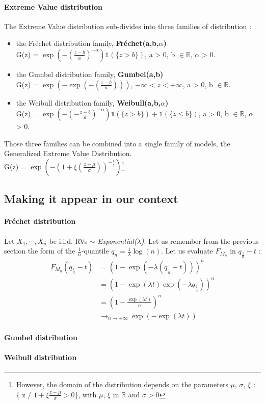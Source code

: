\paragraph{Extreme Value distribution} The Extreme Value distribution sub-divides into three families of distribution :
\begin{itemize}
	\item the Fréchet distribution family, \textbf{Fréchet(a,b,$\alpha$)} \\
	G(z) = $\exp(-(\frac{z-b}{a})^{-\alpha})\mathbb{1}(\{z > b\})$, a > 0, b $\in \mathbb{R}$, $\alpha$ > 0.
	\item the Gumbel distribution family, \textbf{Gumbel(a,b)} \\ 
	G(z) = $\exp(-\exp(-(\frac{z-b}{a})))$, $-\infty < z < +\infty$, a > 0, b $\in \mathbb{R}$.
	\item the Weibull distribution family, \textbf{Weibull(a,b,$\alpha$)} \\
	G(z) = $\exp(-(-\frac{z-b}{a})^{-\alpha})\mathbb{1}(\{z > b\}) + \mathbb{1}(\{z \le b\})$, a > 0, b $\in \mathbb{R}$, $\alpha$ > 0.
\end{itemize}
\newline
Those three families can be combined into a single family of models, the Generalized Extreme Value Distribution. \\
G(z) = $\exp(-(1 + \xi(\frac{z - \mu}{\sigma}))^{-\frac{1}{\xi}})$\footnote{However, the domain of the distribution depends on the parameters $\mu$, $\sigma$, $\xi$ : \{ z / $1 + \xi\frac{z-\mu}{\sigma} > 0$\}, with $\mu$, $\xi$ in $\mathbb{R}$ and $\sigma > 0$}
\subsection{Making it appear in our context}
\paragraph{Fréchet distribution} 
Let $X_1, \cdots, X_n $ be i.i.d. RVs $\sim$ \textit{Exponential($\lambda$)}. Let us remember from the previous section the form of the $\frac{1}{n}$-quantile $q_n = \frac{1}{\lambda}\log(n)$. Let us evaluate $F_{M_n}$ in $q_\frac{1}{n}-t$ : \\
\begin{equation}
\begin{alignat*}{2}
F_{M_n}(q_\frac{1}{n}-t) &= (1 - \exp(-\lambda(q_\frac{1}{n}-t)))^n\\ 
&= (1 - \exp(\lambda t)\exp(-\lambda q_\frac{1}{n}))^n\\ 
&= (1 - \frac{\exp(\lambda t)}{n})^n \\
&\longrightarrow_{n \rightarrow +\infty} \exp(-\exp(\lambda t))
\end{alignat*}
\end{equation}


\paragraph{Gumbel distribution}
\paragraph{Weibull distribution}


